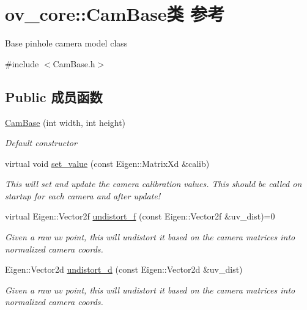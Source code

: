 \hypertarget{classov__core_1_1CamBase}{}\section{ov\+\_\+core\+:\+:Cam\+Base类 参考}
\label{classov__core_1_1CamBase}


Base pinhole camera model class  




{\ttfamily \#include $<$Cam\+Base.\+h$>$}

\subsection*{Public 成员函数}
\begin{DoxyCompactItemize}
\item 
\hyperlink{classov__core_1_1CamBase_a1f11a6e4e8324d6843b578c0dabe0f94}{Cam\+Base} (int width, int height)
\begin{DoxyCompactList}\small\item\em Default constructor \end{DoxyCompactList}\item 
virtual void \hyperlink{classov__core_1_1CamBase_a630f35e703c3893ae694fe0f14693216}{set\+\_\+value} (const Eigen\+::\+Matrix\+Xd \&calib)
\begin{DoxyCompactList}\small\item\em This will set and update the camera calibration values. This should be called on startup for each camera and after update! \end{DoxyCompactList}\item 
virtual Eigen\+::\+Vector2f \hyperlink{classov__core_1_1CamBase_ad0db03f97e5a12f5ad757f72e60f50e4}{undistort\+\_\+f} (const Eigen\+::\+Vector2f \&uv\+\_\+dist)=0
\begin{DoxyCompactList}\small\item\em Given a raw uv point, this will undistort it based on the camera matrices into normalized camera coords. \end{DoxyCompactList}\item 
Eigen\+::\+Vector2d \hyperlink{classov__core_1_1CamBase_ab910cf55ee13ca74eb4b8463ab32f1c4}{undistort\+\_\+d} (const Eigen\+::\+Vector2d \&uv\+\_\+dist)
\begin{DoxyCompactList}\small\item\em Given a raw uv point, this will undistort it based on the camera matrices into normalized camera coords. \end{DoxyCompactList}\item 

\end{DoxyCompactItemize}
